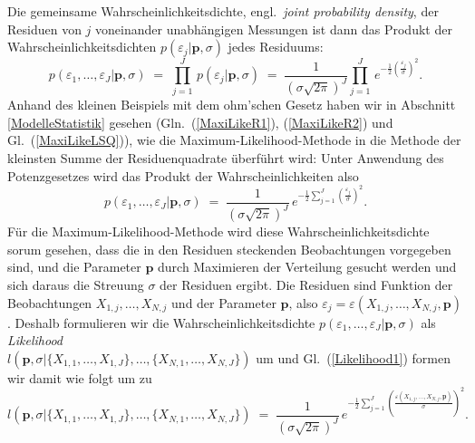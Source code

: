 Die gemeinsame Wahrscheinlichkeitsdichte, engl.\ \textsl{joint probability density}, der
Residuen von $j$ voneinander unabhängigen Messungen ist dann das Produkt der
Wahrscheinlichkeitsdichten $p(\varepsilon_j | \mathbf{p}, \sigma)$
jedes Residuums:
\begin{equation}
p(\varepsilon_1,\dots,\varepsilon_J | \mathbf{p}, \sigma) \; = \;
\prod\limits_{j = 1}^J \, p(\varepsilon_j | \mathbf{p}, \sigma) \; = \;
 \frac{1}{(\sigma \sqrt{2 \pi})^J} \prod\limits_{j = 1}^J \,
e^{-\frac{1}{2} \left(\frac{\varepsilon_j}{\sigma}\right)^2}.
\end{equation}
Anhand des kleinen Beispiels mit dem ohm'schen Gesetz haben wir in Abschnitt \ref{ModelleStatistik}
gesehen (Gln.~(\ref{MaxiLikeR1}), (\ref{MaxiLikeR2}) und Gl.~(\ref{MaxiLikeLSQ})),
wie die Maximum-Likelihood-Methode in die Methode der kleinsten Summe der
Residuenquadrate überführt wird:
Unter Anwendung des Potenzgesetzes wird das Produkt der Wahrscheinlichkeiten also
\begin{equation}
p(\varepsilon_1,\dots,\varepsilon_J | \mathbf{p}, \sigma) \; = \;
 \frac{1}{(\sigma \sqrt{2 \pi})^J}  \,
e^{-\frac{1}{2} \sum\limits_{j = 1}^J \left(\frac{\varepsilon_j}{\sigma}\right)^2} .
\label{Likelihood1}
\end{equation}
Für die Maximum-Likelihood-Methode wird diese Wahrscheinlichkeitsdichte sorum gesehen,
dass die in den Residuen steckenden Beobachtungen vorgegeben sind, und die
Parameter $\mathbf{p}$ durch Maximieren der Verteilung gesucht werden und sich daraus
die Streuung $\sigma$ der Residuen ergibt. Die Residuen sind Funktion der
Beobachtungen $X_{1,j},\dots,X_{N,j}$ und der Parameter $\mathbf{p}$, also
$\varepsilon_j = \varepsilon(X_{1,j},\dots,X_{N,j}, \mathbf{p})$.
Deshalb formulieren wir die Wahrscheinlichkeitsdichte
$p(\varepsilon_1,\dots,\varepsilon_J | \mathbf{p}, \sigma)$
als \textsl{Likelihood} \\
$l(\mathbf{p}, \sigma | \{X_{1,1}, \dots, X_{1,J}\}, \dots, \{X_{N,1}, \dots, X_{N,J}\})$
um und Gl.~(\ref{Likelihood1}) formen wir damit wie folgt um zu
\begin{equation}
l(\mathbf{p}, \sigma | \{X_{1,1}, \dots, X_{1,J}\}, \dots, \{X_{N,1}, \dots, X_{N,J}\}) \; = \;
 \frac{1}{(\sigma \sqrt{2 \pi})^J}  \,
e^{-\frac{1}{2} \sum\limits_{j = 1}^J \left(\frac{\varepsilon(X_{1,j},\dots,X_{N,j}, \mathbf{p})}{\sigma}\right)^2} .
\label{Likelihood2}
\end{equation}

